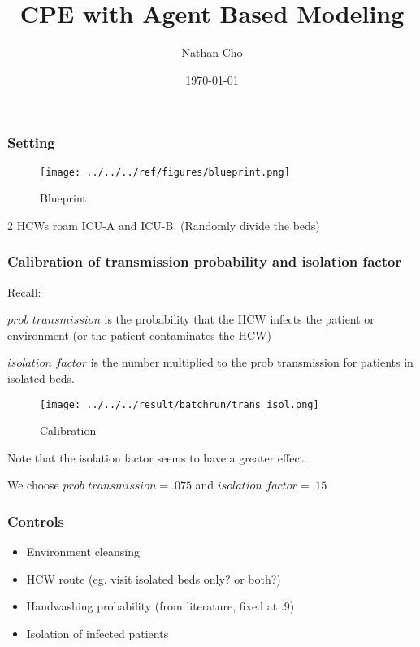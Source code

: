 \documentclass[aspectratio=169, 9pt, xcolor=table]{beamer}
\title{CPE with Agent Based Modeling}
\author{Nathan Cho}
\institute{Computational Science and Engineering}
\date{\today}
\begin{document}
\begin{frame}
    \titlepage
\end{frame}


\begin{frame}
    \frametitle{Setting}
    \begin{figure}[H]
        \centering
        \texttt{[image: ../../../ref/figures/blueprint.png]} %
        \caption{Blueprint}
    \end{figure}
    2 HCWs roam ICU-A and ICU-B. (Randomly divide the beds)
\end{frame}

\begin{frame}
    \frametitle{Calibration of transmission probability and isolation factor}
    
    Recall:
    
    $\textit{prob transmission}$ is the probability that the HCW infects the patient or environment (or the patient contaminates the HCW)
    
    $\textit{isolation factor}$ is the number multiplied to the prob transmission for patients in isolated beds.


    \begin{figure}[H]
        \centering
        \texttt{[image: ../../../result/batchrun/trans\_isol.png]} %
        \caption{Calibration}
    \end{figure}
    Note that the isolation factor seems to have a greater effect.

    We choose $\textit{prob transmission} = .075$ and $\textit{isolation factor} = .15$

    
    

\end{frame}



\begin{frame}
    \frametitle{Controls}
    
    \begin{itemize}
        \item Environment cleansing
        \item HCW route (eg. visit isolated beds only? or both?)
        \item Handwashing probability (from literature, fixed at .9)
        \item Isolation of infected patients
    \end{itemize}
\end{frame}
\end{document}
